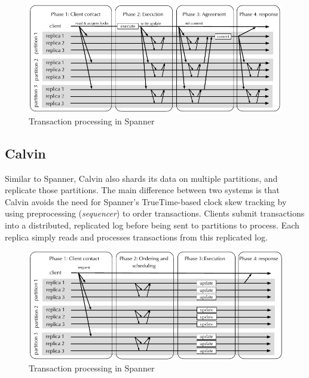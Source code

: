 \begin{figure}
  \begin{minipage}[b]{1.0\linewidth}
  \centering
        \includegraphics[width=1\linewidth]{figures/spanner}
  \end{minipage}
  \caption{Transaction processing in Spanner}
  \label{fig:spanner}
\end{figure}

\subsection{Calvin}
Similar to Spanner, Calvin also shards its data on multiple partitions, and
replicate those partitions. The main difference between two systems is that
Calvin avoids the need for Spanner’s TrueTime-based clock skew tracking by using
preprocessing (\emph{sequencer}) to order transactions. Clients submit
transactions into a distributed, replicated log before being sent to partitions
to process. Each replica simply reads and processes transactions from this
replicated log.

\begin{figure}
  \begin{minipage}[b]{1.0\linewidth}
  \centering
        \includegraphics[width=1\linewidth]{figures/calvin}
  \end{minipage}
  \caption{Transaction processing in Spanner}
  \label{fig:calvin}
\end{figure}

